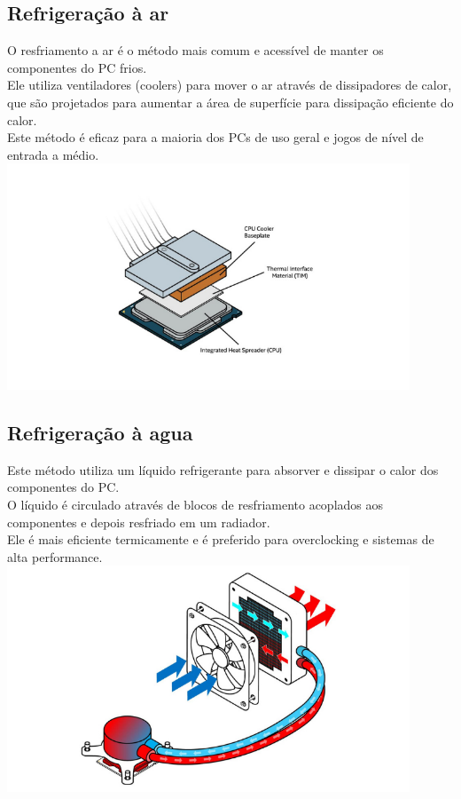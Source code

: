 \documentclass[12pt]{article}
\begin{document}
\subsection{Refrigeração à ar}
O resfriamento a ar é o método mais comum e acessível de manter os componentes do PC frios. \\
Ele utiliza ventiladores (coolers) para mover o ar através de dissipadores de calor, que são projetados para aumentar a área de superfície para dissipação eficiente do calor. \\
Este método é eficaz para a maioria dos PCs de uso geral e jogos de nível de entrada a médio. \\
\begin{adjustbox}{center,caption={Funcionamento básico de refrigeração a ar (Imagem: Intel/Divulgação)},nofloat=figure,vspace=\bigskipamount}
    \includegraphics[width=12cm]{fusca.png}
\end{adjustbox}
\subsection{Refrigeração à agua}
Este método utiliza um líquido refrigerante para absorver e dissipar o calor dos componentes do PC. \\
O líquido é circulado através de blocos de resfriamento acoplados aos componentes e depois resfriado em um radiador. \\
Ele é mais eficiente termicamente e é preferido para overclocking e sistemas de alta performance.\\
\begin{adjustbox}{center,caption={Exemplo de refrigeração liquida (Imagem: Intel/Divulgação)},nofloat=figure,vspace=\bigskipamount}
    \includegraphics[width=12cm]{ap.png}
\end{adjustbox}
\end{document}
